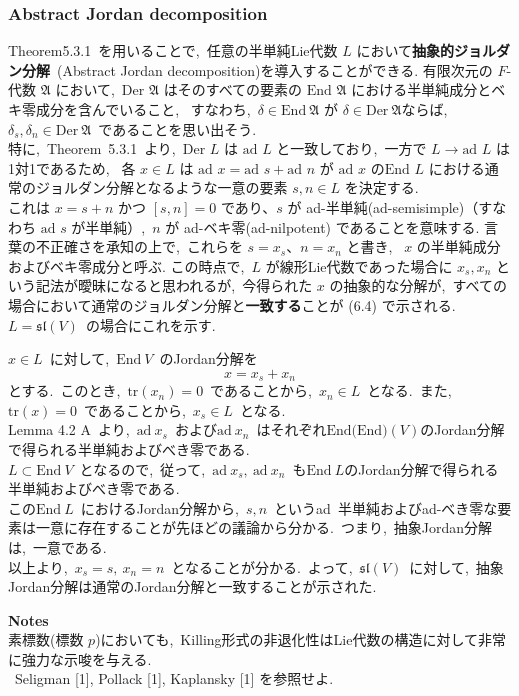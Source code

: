 \documentclass[uplatex,dvipdfmx]{jsarticle}
\begin{document}
\subsubsection{Abstract Jordan decomposition}
Theorem5.3.1~を用いることで,~任意の半単純Lie代数 $L$ において\textbf{抽象的ジョルダン分解}~(Abstract Jordan decomposition)を導入することができる.
有限次元の $F$-代数 $\mathfrak{A}$ において,~$\text{Der } \mathfrak{A}$ はそのすべての要素の $\text{End } \mathfrak{A}$ における半単純成分とベキ零成分を含んでいること,~
すなわち,~$\delta \in  \text{End}~\mathfrak{A}$ が $\delta \in  \text{Der}~\mathfrak{A}$ならば,~$\delta_s, \delta_n \in  \text{Der}~\mathfrak{A}$~であることを思い出そう.\\
特に,~Theorem~5.3.1~より,~$\text{Der } L$ は $\text{ad } L$ と一致しており,~一方で $L \to \text{ad } L$ は1対1であるため,~
各 $x \in L$ は $\text{ad } x = \text{ad } s + \text{ad } n$ が $\text{ad } x$ の$\text{End } L$ における通常のジョルダン分解となるような一意の要素 $s, n \in L$ を決定する.\\
これは $x = s + n$ かつ $[s, n] = 0$ であり、$s$ が ad-半単純(ad-semisimple)（すなわち $\text{ad } s$ が半単純）,~$n$ が ad-ベキ零(ad-nilpotent) であることを意味する.
言葉の不正確さを承知の上で,~これらを $s = x_s$、$n = x_n$ と書き,~ $x$ の半単純成分およびベキ零成分と呼ぶ.
この時点で,~$L$ が線形Lie代数であった場合に $x_s, x_n$ という記法が曖昧になると思われるが,~今得られた $x$ の抽象的な分解が,~すべての場合において通常のジョルダン分解と\textbf{一致する}ことが (6.4) で示される.\\
$L=\mathfrak{sl}(V)$~の場合にこれを示す.
\begin{myproof}
    $x\in L$~に対して,~$\text{End}~V$~のJordan分解を
    \begin{equation*}
        x=x_s + x_n
    \end{equation*}
    とする.~このとき,~$\text{tr}(x_n)=0$~であることから,~$x_n\in L$~となる.~また,~$\text{tr}(x)=0$~であることから,~$x_s\in L$~となる.\\
    Lemma 4.2 A~より,~$\text{ad}~x_s$~および$\text{ad}~x_n$~はそれぞれ$\text{End(End)}(V)$のJordan分解で得られる半単純およびべき零である.\\
    $L\subset \text{End}~V$~となるので,~従って,~$\text{ad}~x_s,~\text{ad}~x_n$~も$\text{End}~L$のJordan分解で得られる半単純およびべき零である.\\
    この$\text{End}~L$~におけるJordan分解から,~$s,n$~というad~半単純およびad-べき零な要素は一意に存在することが先ほどの議論から分かる.~つまり,~抽象Jordan分解は,~一意である.\\
    以上より,~$x_s=s,~x_n=n$~となることが分かる.~よって,~$\mathfrak{sl}(V)$~に対して,~抽象Jordan分解は通常のJordan分解と一致することが示された.
\end{myproof}
\textbf{Notes}\\
素標数(標数 $p$)においても,~Killing形式の非退化性はLie代数の構造に対して非常に強力な示唆を与える.\\
~Seligman [1], Pollack [1], Kaplansky [1] を参照せよ.
\newpage
\end{document}
